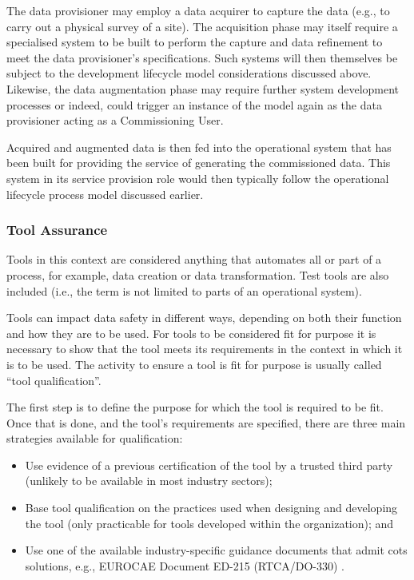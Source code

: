 The data provisioner may employ a data acquirer to capture the data (e.g., to carry out a physical survey of a site). The acquisition phase may itself require a specialised system to be built to perform the capture and data refinement to meet the data provisioner's specifications. Such systems will then themselves be subject to the development lifecycle model considerations discussed above. Likewise, the data augmentation phase may require further system development processes or indeed, could trigger an instance of the model again as the data provisioner acting as a Commissioning User.

Acquired and augmented data is then fed into the operational system that has been built for providing the service of generating the commissioned data. This system in its service provision role would then typically follow the operational lifecycle process model discussed earlier.

\subsubsection{Tool Assurance}
Tools in this context are considered anything that automates all or part of a process, for example, data creation or data transformation. Test tools are also included (i.e., the term is not limited to parts of an operational system).

Tools can impact data safety in different ways, depending on both their function and how they are to be used. For tools to be considered fit for purpose it is necessary to show that the tool meets its requirements in the context in which it is to be used. The activity to ensure a tool is fit for purpose is usually called ``tool qualification''.

The first step is to define the purpose for which the tool is required to be fit. Once that is done, and the tool's requirements are specified, there are three main strategies available for qualification:
\begin{itemize}
  \item Use evidence of a previous certification of the tool by a trusted third party (unlikely to be available in most industry sectors);
  \item Base tool qualification on the practices used when designing and developing the tool (only practicable for tools developed within the organization); and
  \item Use one of the available industry-specific guidance documents that admit \gls{cots} solutions, e.g., EUROCAE Document ED-215 (RTCA/DO-330) \cite{citation:ED215}.
\end{itemize}

